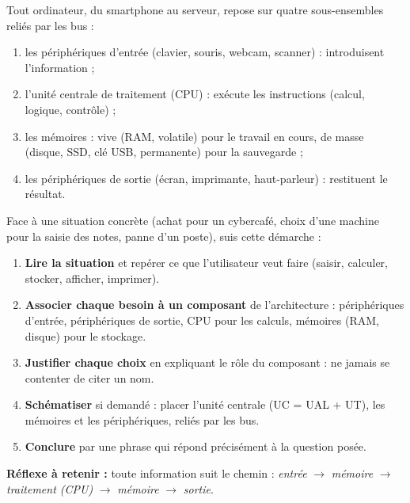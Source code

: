 \documentclass[11pt]{article}
\newcommand{\cle}[1]{{\popxbold\color{popdark}#1}}
\begin{document}
\begin{aretenir}
Tout ordinateur, du smartphone au serveur, repose sur quatre sous-ensembles reliés par les \cle{bus} :
\begin{enumerate}
\item les \cle{périphériques d'entrée} (clavier, souris, webcam, scanner) : introduisent l'information ;
\item l'\cle{unité centrale de traitement} (CPU) : exécute les instructions (calcul, logique, contrôle) ;
\item les \cle{mémoires} : \cle{vive} (RAM, volatile) pour le travail en cours, \cle{de masse} (disque, SSD, clé USB, permanente) pour la sauvegarde ;
\item les \cle{périphériques de sortie} (écran, imprimante, haut-parleur) : restituent le résultat.
\end{enumerate}
\end{aretenir}

\begin{methode}
Face à une situation concrète (achat pour un cybercafé, choix d'une machine pour la saisie des notes, panne d'un poste), suis cette démarche :
\begin{enumerate}
\item \textbf{Lire la situation} et repérer ce que l'utilisateur veut faire (saisir, calculer, stocker, afficher, imprimer).
\item \textbf{Associer chaque besoin à un composant} de l'architecture : périphériques d'\cle{entrée}, périphériques de \cle{sortie}, \cle{CPU} pour les calculs, \cle{mémoires} (RAM, disque) pour le stockage.
\item \textbf{Justifier chaque choix} en expliquant le rôle du composant : ne jamais se contenter de citer un nom.
\item \textbf{Schématiser} si demandé : placer l'unité centrale (UC = UAL + UT), les mémoires et les périphériques, reliés par les \cle{bus}.
\item \textbf{Conclure} par une phrase qui répond précisément à la question posée.
\end{enumerate}
\textbf{Réflexe à retenir :} toute information suit le chemin : \emph{entrée} $\rightarrow$ \emph{mémoire} $\rightarrow$ \emph{traitement (CPU)} $\rightarrow$ \emph{mémoire} $\rightarrow$ \emph{sortie}.
\end{methode}
\end{document}
